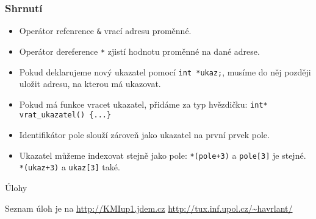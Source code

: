 \documentclass{beamer}
\newenvironment{itemize4}%
  {\large \begin{itemize}%
    \setlength{\itemsep}{4pt}%
    \setlength{\parskip}{4pt}}%
  {\end{itemize}}
\begin{document}
\begin{frame}[t,fragile]\frametitle{Shrnutí} 
    \begin{itemize4}
        \item Operátor refenrence \texttt{\&} vrací adresu proměnné.
        \item Operátor dereference \texttt{*} zjistí hodnotu proměnné na dané adrese. 
        \item Pokud deklarujeme nový ukazatel pomocí \texttt{int *ukaz;}, musíme do něj později uložit adresu, na kterou má ukazovat.
        \item Pokud má funkce vracet ukazatel, přidáme za typ hvězdičku: \texttt{int* vrat\_ukazatel() \{...\}}
        \item Identifikátor pole slouží zároveň jako ukazatel na první prvek pole. 
        \item Ukazatel můžeme indexovat stejně jako pole: \texttt{*(pole+3)} a \texttt{pole[3]} je stejné. \texttt{*(ukaz+3)} a \texttt{ukaz[3]} také. 
    \end{itemize4}
\end{frame}


\begin{frame}[t,fragile]{Úlohy}
\begin{center}
\vskip 1cm
{\Large Seznam úloh je na \url{http://KMIup1.jdem.cz}}
\vskip 2cm
\url{http://tux.inf.upol.cz/~havrlant/}
\end{center}
\end{frame}
\end{document}
